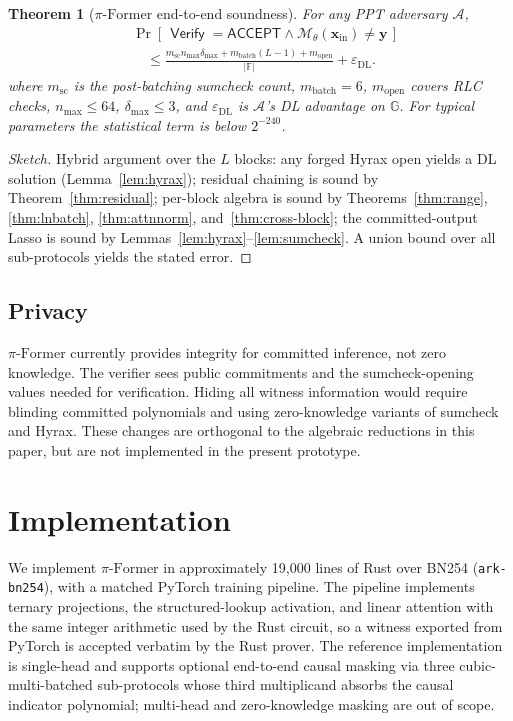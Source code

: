 \documentclass[letterpaper,twocolumn,10pt]{article}
\newtheorem{theorem}{Theorem}
\theoremstyle{remark}
\theoremstyle{definition}
\newcommand{\sys}{\ensuremath{\pi\text{-Former}}}
\newcommand{\FF}{\mathbb{F}}
\newcommand{\GG}{\mathbb{G}}
\newcommand{\bx}{\mathbf{x}}
\newcommand{\by}{\mathbf{y}}
\newcommand{\calM}{\mathcal{M}}
\newcommand{\calA}{\mathcal{A}}
\DeclareMathOperator{\Verify}{\mathsf{Verify}}
\begin{document}
\begin{theorem}[\sys{} end-to-end soundness]
\label{thm:end-to-end}
For any PPT adversary $\calA$,
\begin{align*}
  &\Pr[\,\Verify=\mathsf{ACCEPT}
       \wedge \calM_\theta(\bx_{\mathrm{in}})\ne\by\,] \\
  &\quad \le
  \frac{
    m_{\mathrm{sc}}n_{\max}\delta_{\max}
    +m_{\mathrm{batch}}(L-1)+m_{\mathrm{open}}
  }{|\FF|}
  +\varepsilon_{\mathrm{DL}} .
\end{align*}
where $m_{\mathrm{sc}}$ is the post-batching sumcheck count,
$m_{\mathrm{batch}}\!=\!6$, $m_{\mathrm{open}}$ covers RLC checks,
$n_{\max}\!\le\!64$, $\delta_{\max}\!\le\!3$, and
$\varepsilon_{\mathrm{DL}}$ is $\calA$'s DL advantage on $\GG$. For
typical parameters the statistical term is below $2^{-240}$.
\end{theorem}
\begin{proof}[Sketch]
Hybrid argument over the $L$ blocks: any forged Hyrax open yields a DL
solution (Lemma~\ref{lem:hyrax}); residual chaining is sound by
Theorem~\ref{thm:residual}; per-block algebra is sound by
Theorems~\ref{thm:range}, \ref{thm:lnbatch}, \ref{thm:attnnorm},
and~\ref{thm:cross-block}; the committed-output Lasso is sound by
Lemmas~\ref{lem:hyrax}--\ref{lem:sumcheck}. A union bound over all
sub-protocols yields the stated error.
\end{proof}

\subsection{Privacy}
\sys{} currently provides integrity for committed inference, not
zero knowledge. The verifier sees public commitments and the
sumcheck-opening values needed for verification. Hiding all witness
information would require blinding committed polynomials and using
zero-knowledge variants of sumcheck and Hyrax. These changes are
orthogonal to the algebraic reductions in this paper, but are not
implemented in the present prototype.

\section{Implementation}
\label{sec:impl}

We implement \sys{} in approximately 19{,}000 lines of Rust over
BN254 (\texttt{ark-bn254}), with a matched PyTorch training pipeline.
The pipeline implements ternary projections, the structured-lookup
activation, and linear attention with the same integer arithmetic used
by the Rust circuit, so a witness exported from PyTorch is accepted
verbatim by the Rust prover. The reference implementation is
single-head and supports optional end-to-end causal masking via three
cubic-multi-batched sub-protocols whose third multiplicand absorbs the
causal indicator polynomial; multi-head and zero-knowledge masking
are out of scope.
\end{document}
